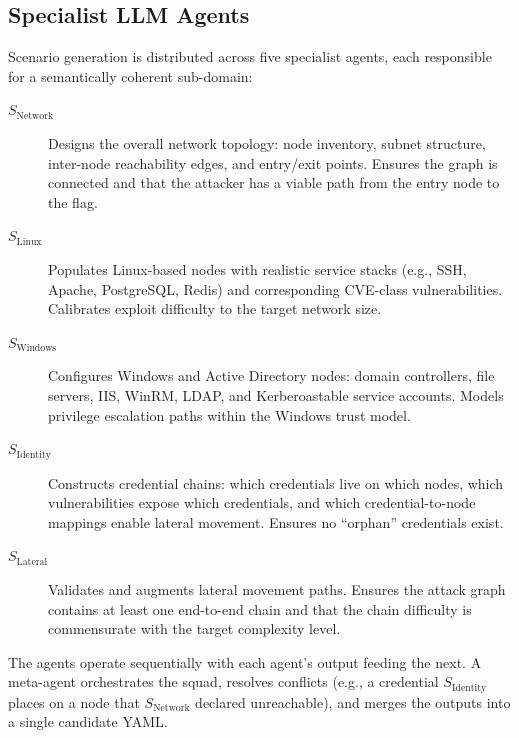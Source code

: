 \documentclass[11pt,a4paper]{article}
\begin{document}
\subsection{Specialist LLM Agents}
\label{sec:agents}

Scenario generation is distributed across five specialist agents, each
responsible for a semantically coherent sub-domain:

\begin{description}
    \item[$S_{\text{Network}}$] Designs the overall network topology:
          node inventory, subnet structure, inter-node reachability edges, and
          entry/exit points.  Ensures the graph is connected and that the
          attacker has a viable path from the entry node to the flag.

    \item[$S_{\text{Linux}}$] Populates Linux-based nodes with realistic
          service stacks (e.g., SSH, Apache, PostgreSQL, Redis) and
          corresponding CVE-class vulnerabilities.  Calibrates exploit
          difficulty to the target network size.

    \item[$S_{\text{Windows}}$] Configures Windows and Active Directory nodes:
          domain controllers, file servers, IIS, WinRM, LDAP, and
          Kerberoastable service accounts.  Models privilege escalation paths
          within the Windows trust model.

    \item[$S_{\text{Identity}}$] Constructs credential chains: which
          credentials live on which nodes, which vulnerabilities expose which
          credentials, and which credential-to-node mappings enable lateral
          movement.  Ensures no ``orphan'' credentials exist.

    \item[$S_{\text{Lateral}}$] Validates and augments lateral movement
          paths.  Ensures the attack graph contains at least one end-to-end
          chain and that the chain difficulty is commensurate with the target
          complexity level.
\end{description}

The agents operate sequentially with each agent's output feeding the next.
A meta-agent orchestrates the squad, resolves conflicts (e.g., a credential
$S_{\text{Identity}}$ places on a node that $S_{\text{Network}}$ declared
unreachable), and merges the outputs into a single candidate YAML.
\end{document}
